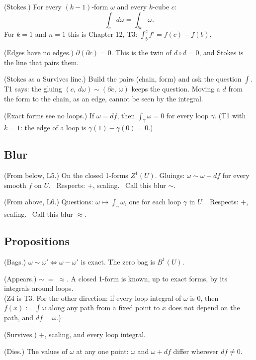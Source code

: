 \begin{lines}
\item[\lab{T1}] (Stokes.) For every $(k{-}1)$-form $\omega$ and every $k$-cube $c$:
\[
\int_c d\omega = \int_{\partial c} \omega .
\]
For $k = 1$ and $n = 1$ this is Chapter 12, T3: $\int_b^c f' = f(c) - f(b)$.
\item[\lab{T2}] (Edges have no edges.) $\partial(\partial c) = 0$. This is the twin of $d \circ d = 0$, and Stokes is the line that pairs them.
\item[] (Stokes as a Survives line.) Build the pairs (chain, form) and ask the question $\int$. T1 says: the gluing $(c,\ d\omega) \sim (\partial c,\ \omega)$ keeps the question. Moving a $d$ from the form to the chain, as an edge, cannot be seen by the integral.
\item[\lab{T3}] (Exact forms see no loops.) If $\omega = df$, then $\int_\gamma \omega = 0$ for every loop $\gamma$. (T1 with $k = 1$: the edge of a loop is $\gamma(1) - \gamma(0) = 0$.)
\end{lines}

\subsection*{Blur}

\begin{lines}
\item[\lab{B1}] (From below, L5.) On the closed 1-forms $Z^1(U)$. Gluings: $\omega \sim \omega + df$ for every smooth $f$ on $U$. \ Respects: $+$, scaling. \ Call this blur $\sim$.
\item[\lab{B2}] (From above, L6.) Questions: $\omega \mapsto \int_\gamma \omega$, one for each loop $\gamma$ in $U$. \ Respects: $+$, scaling. \ Call this blur $\approx$.
\end{lines}

\subsection*{Propositions}

\begin{lines}
\item[\lab{P1}] (Bags.) $\omega \sim \omega' \iff \omega - \omega'$ is exact. The zero bag is $B^1(U)$.
\item[\lab{P2}] (Appears.) $\sim \;=\; \approx$. A closed 1-form is known, up to exact forms, by its integrals around loops. \\
(Z4 is T3. For the other direction: if every loop integral of $\omega$ is $0$, then $f(x) := \int \omega$ along any path from a fixed point to $x$ does not depend on the path, and $df = \omega$.)
\item[\lab{P3}] (Survives.) $+$, scaling, and every loop integral.
\item[\lab{P4}] (Dies.) The values of $\omega$ at any one point: $\omega$ and $\omega + df$ differ wherever $df \neq 0$.
\end{lines}

